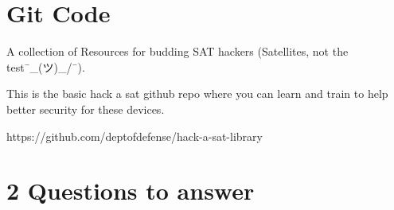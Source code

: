 \section{Git Code}
A collection of Resources for budding SAT hackers (Satellites, not the test¯\_(ツ)_/¯).

This is the basic hack a sat github repo where you can learn and train to help better security for these devices.

https://github.com/deptofdefense/hack-a-sat-library

\section{2 Questions to answer}







%
